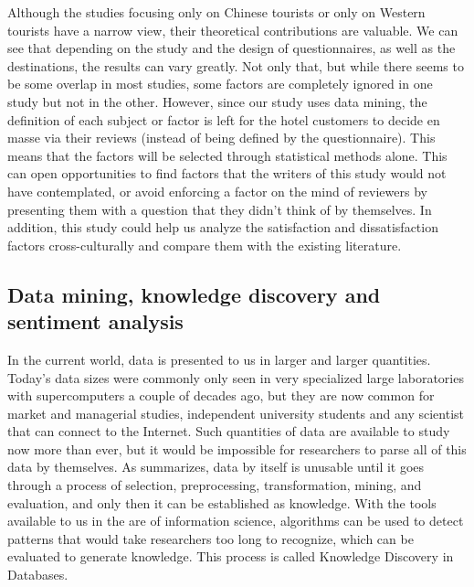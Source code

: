 \documentclass[review]{elsarticle}
\begin{document}
Although the studies focusing only on Chinese tourists or only on Western tourists have a narrow view, their theoretical contributions are valuable. We can see that depending on the study and the design of questionnaires, as well as the destinations, the results can vary greatly. Not only that, but while there seems to be some overlap in most studies, some factors are completely ignored in one study but not in the other. However, since our study uses data mining, the definition of each subject or factor is left for the hotel customers to decide en masse via their reviews (instead of being defined by the questionnaire). This means that the factors will be selected through statistical methods alone. This can open opportunities to find factors that the writers of this study would not have contemplated, or avoid enforcing a factor on the mind of reviewers by presenting them with a question that they didn't think of by themselves. In addition, this study could help us analyze the satisfaction and dissatisfaction factors cross-culturally and compare them with the existing literature.

\subsection{Data mining, knowledge discovery and sentiment analysis}\label{theory_data}

In the current world, data is presented to us in larger and larger quantities. Today's data sizes were commonly only seen in very specialized large laboratories with supercomputers a couple of decades ago, but they are now common for market and managerial studies, independent university students and any scientist that can connect to the Internet. Such quantities of data are available to study now more than ever, but it would be impossible for researchers to parse all of this data by themselves. As \cite{fayyad1996data} summarizes, data by itself is unusable until it goes through a process of selection, preprocessing, transformation, mining, and evaluation, and only then it can be established as knowledge. With the tools available to us in the are of information science, algorithms can be used to detect patterns that would take researchers too long to recognize, which can be evaluated to generate knowledge. This process is called Knowledge Discovery in Databases. 
\end{document}
